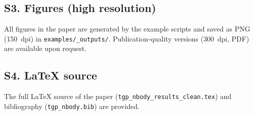 \subsection*{S3. Figures (high resolution)}

All figures in the paper are generated by the example scripts and
saved as PNG (150~dpi) in \texttt{examples/\_outputs/}.
Publication-quality versions (300~dpi, PDF) are available upon request.

\subsection*{S4. LaTeX source}

The full \LaTeX{} source of the paper (\texttt{tgp\_nbody\_results\_clean.tex})
and bibliography (\texttt{tgp\_nbody.bib}) are provided.
